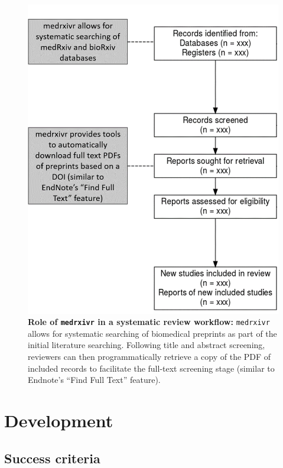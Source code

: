 \documentclass[a4paper, twoside]{templates/ociamthesis}
\begin{document}
\begin{figure}
\includegraphics[width=1\linewidth]{figures/sys-rev-tools/medrxiv-role} \caption[Role of \texttt{medrxivr} in a systematic review workflow]{\textbf{Role of \texttt{medrxivr} in a systematic review workflow:} \texttt{medrxivr} allows for systematic searching of biomedical preprints as part of the initial literature searching. Following title and abstract screening, reviewers can then programmatically retrieve a copy of the PDF of included records to facilitate the full-text screening stage (similar to Endnote's ``Find Full Text'' feature).}\label{fig:medrxivr-sr}
\end{figure}

\hypertarget{development}{%
\section{Development}\label{development}}

\hypertarget{success-criteria}{%
\subsection{Success criteria}\label{success-criteria}}
\end{document}
